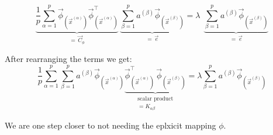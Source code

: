 \begin{frame}{\subsubsecname}



\begin{equation}
\underbrace{\frac{1}{p} \sum_{\alpha=1}^{p} \vec{\phi}_{(\vec{x}^{(\alpha)})} \vec{\phi}^{\top}_{(\vec{x}^{(\alpha)})} 
}_{=\,\vec C_{\phi}}
 \, 
\underbrace{\sum^{p}_{\beta=1} a^{(\beta)} \vec{\phi}_{(\vec{x}^{(\beta)})}}_{=\,\vec e}
 = \lambda \;\,
\underbrace{\sum^{p}_{\beta=1} a^{(\beta)} \vec{\phi}_{(\vec{x}^{(\beta)})}}_{=\,\vec e}
\end{equation}

\pause

After rearranging the terms we get:
\begin{equation} \label{eq:eig2}
\frac{1}{p} \sum_{\alpha=1}^{p} \sum^{p}_{\beta=1} 
a^{(\beta)} \vec{\phi}_{(\vec{x}^{(\alpha)})}
\underbrace{
 \vec{\phi}^{\top}_{(\vec{x}^{(\alpha)})} \,  \vec{\phi}_{(\vec{x}^{(\beta)})}
}_{\substack{\text{scalar product}\\ = K_{\alpha\beta}}}
 = \lambda 
\sum^{p}_{\beta=1} a^{(\beta)} \vec{\phi}_{(\vec{x}^{(\beta)})}
\end{equation}

We are one step closer to not needing the eplxicit mapping $\phi$.

\end{frame}

